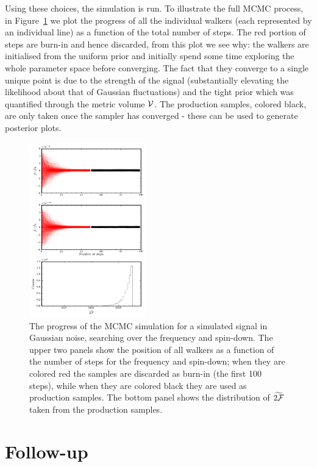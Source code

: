 \documentclass[aps, prd, twocolumn, superscriptaddress, floatfix, showpacs, nofootinbib, longbibliography]{revtex4-1}
\begin{document}
Using these choices, the simulation is run. To illustrate the full MCMC
process, in Figure~\ref{fig_MCMC_simple_example} we plot the progress of all
the individual walkers (each represented by an individual line) as a function
of the total number of steps. The red portion of steps are burn-in and hence
discarded, from this plot we see why: the walkers are initialised from the
uniform prior and initially spend some time exploring the whole parameter space
before converging. The fact that they converge to a single unique point is due
to the strength of the signal (substantially elevating the likelihood about
that of Gaussian fluctuations) and the tight prior which was quantified through the
metric volume $\mathcal{V}$. The production samples, colored black, are only taken once
the sampler has converged - these can be used to generate posterior plots.
\begin{figure}[htb]
\centering
\includegraphics[width=0.45\textwidth]{fully_coherent_search_using_MCMC_walkers}
\caption{The progress of the MCMC simulation for a simulated signal in Gaussian
noise, searching over the frequency and spin-down. The upper two panels show
the position of all walkers as a function of the number of steps for the
frequency and spin-down; when they are colored red the samples are discarded as
burn-in (the first 100 steps), while when they are colored black they are used
as production samples. The bottom panel shows the distribution of
$\widetilde{2{\mathcal{F}}}$ taken from the production samples.}
\label{fig_MCMC_simple_example}
\end{figure}

\section{Follow-up}
\label{sec_follow_up}
\end{document}
